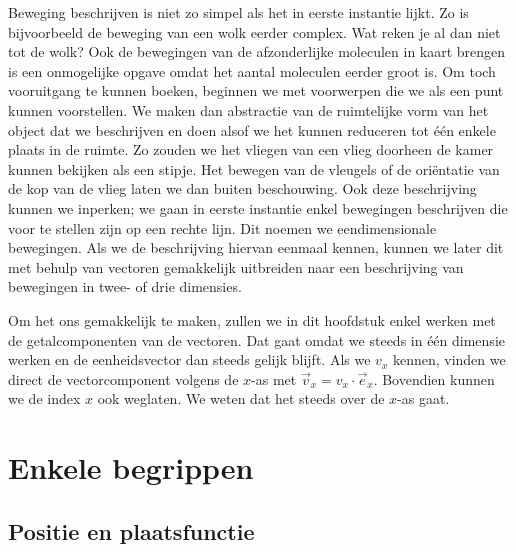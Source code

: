 \documentclass{ximera}
\begin{document}
	\author{Bart Lambregs}
    \xmsource


	Beweging beschrijven is niet zo simpel als het in eerste instantie lijkt. Zo is bijvoorbeeld de beweging van een wolk eerder complex. Wat reken je al dan niet tot de wolk? Ook de bewegingen van de afzonderlijke moleculen in kaart brengen is een onmogelijke opgave omdat het aantal moleculen eerder groot is. Om toch vooruitgang te kunnen boeken, beginnen we met voorwerpen die we als een punt kunnen voorstellen. We maken dan abstractie van de ruimtelijke vorm van het object dat we beschrijven en doen alsof we het kunnen reduceren tot \'e\'en enkele plaats in de ruimte. Zo zouden we het vliegen van een vlieg doorheen de kamer kunnen bekijken als een stipje. Het bewegen van de vleugels of de ori\"entatie van de kop van de vlieg laten we dan buiten beschouwing. Ook deze beschrijving kunnen we inperken; we gaan in eerste instantie enkel bewegingen beschrijven die voor te stellen zijn op een rechte lijn. Dit noemen we eendimensionale bewegingen. Als we de beschrijving hiervan eenmaal kennen, kunnen we later dit met behulp van vectoren gemakkelijk uitbreiden naar een beschrijving van bewegingen in twee- of drie dimensies.
	
	Om het ons gemakkelijk te maken, zullen we in dit hoofdstuk enkel werken met de getalcomponenten van de vectoren. Dat gaat omdat we steeds in \'e\'en dimensie werken en de eenheidsvector dan steeds gelijk blijft. Als we $v_x$ kennen, vinden we direct de vectorcomponent volgens de $x$-as met $\vec{v}_x=v_x\cdot\vec{e}_x$. Bovendien kunnen we de index $x$ ook weglaten. We weten dat het steeds over de $x$-as gaat.
	
	

	
	\section{Enkele begrippen}
	\subsection{Positie en plaatsfunctie}
	
\end{document}
